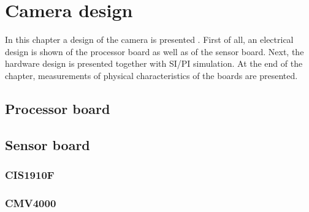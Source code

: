 \chapter{Camera design}

In this chapter a design of the camera is presented . First of all, an electrical design is shown of the processor board as well as of the sensor board. Next, the hardware design is presented together with SI/PI simulation.
At the end of the chapter, measurements of physical characteristics of the boards are presented.

\section{Processor board} 
\section{Sensor board}
\subsection{CIS1910F}
\subsection{CMV4000}



